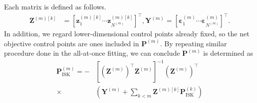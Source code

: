 \documentclass[letterpaper]{article} %
\theoremstyle{plain}
\newcommand{\paren}[1]{\left( #1 \right)}
\newcommand{\sqbra}[1]{\left[#1 \right]}
\begin{document}
Each matrix is defined as follows.
\begin{align*}
    {\bm Z}^{(m) [k]}
    &=
    \sqbra{{\bm z}_1^{(m) [k]}
    \cdots
    {\bm z}_{N^{(m)}}^{(m) [k]}}^\top,
    {\bm Y}^{(m)}
    =
    \sqbra{{\bm \varepsilon}_1^{(m)}
    \cdots
    {\bm \varepsilon}_{N^{(m)}}^{(m)}}^\top.
\end{align*}
In addition, we regard lower-dimensional control points already fixed, so the net objective control points are ones included in $\bm P^{(m)}$.
By repeating similar procedure done in the all-at-once fitting, we can conclude $\bm P^{(m)}$ is determined as
\begin{equation}
    \begin{split}
    {\bm P}_\mathrm{ISK}^{(m)}
    =
    -
    &[({\bm Z}^{(m)})^\top {\bm Z}^{(m)}]^{-1}
    ({\bm Z}^{(m)})^\top \\
    \times &\paren{
    {\bm Y}^{(m)}
    +
    \sum_{k < m}
    {\bm Z}^{(m) [k]}
    {\bm P}_\mathrm{ISK}^{(k)}
    }
    \label{eqn:P_OLS}
    \end{split}
\end{equation}


\end{document}
